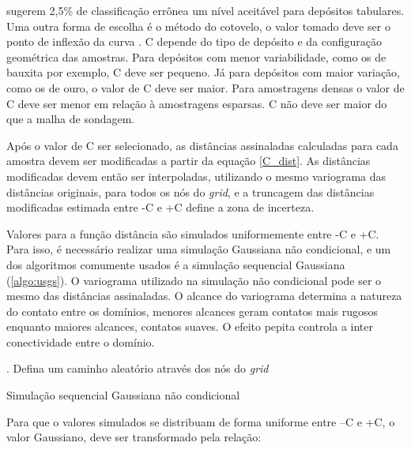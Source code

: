  sugerem 2,5\% de classificação errônea um nível aceitável para depósitos tabulares. Uma outra forma de escolha é o método do cotovelo, o valor tomado deve ser o ponto de inflexão da curva \cite{martin2017implicitmodeling}. C depende do tipo de depósito e da configuração geométrica das amostras. Para depósitos com menor variabilidade, como os de bauxita por exemplo, C deve ser pequeno. Já para depósitos com maior variação, como os de ouro, o valor de C deve ser maior. Para amostragens densas o valor de C deve ser menor em relação à amostragens esparsas. C não deve ser maior do que a malha de sondagem.

Após o valor de C ser selecionado, as distâncias assinaladas calculadas para cada amostra devem ser modificadas a partir da equação \autoref{C_dist}. As distâncias modificadas devem então ser interpoladas, utilizando o mesmo variograma das distâncias originais, para todos os nós do \textit{grid}, e a truncagem das distâncias modificadas estimada entre -C e +C define a zona de incerteza.

Valores para a função distância são simulados uniformemente entre -C e +C. Para isso, é necessário realizar uma simulação Gaussiana não condicional, e um dos algoritmos comumente usados é a simulação sequencial Gaussiana (\autoref{algo:usgs}). O variograma utilizado na simulação não condicional pode ser o mesmo das distâncias assinaladas. O alcance do variograma determina a natureza do contato entre os domínios, menores alcances geram contatos mais rugosos enquanto maiores alcances, contatos suaves. O efeito pepita controla a inter conectividade entre o domínio.

\begin{algorithm}
. Defina um caminho aleatório através dos nós do \textit{grid}\;
 \caption{Simulação sequencial Gaussiana não condicional}\label{algo:usgs}
\end{algorithm}

Para que o valores simulados se distribuam de forma uniforme entre –C e +C, o valor Gaussiano, deve ser transformado pela relação:

